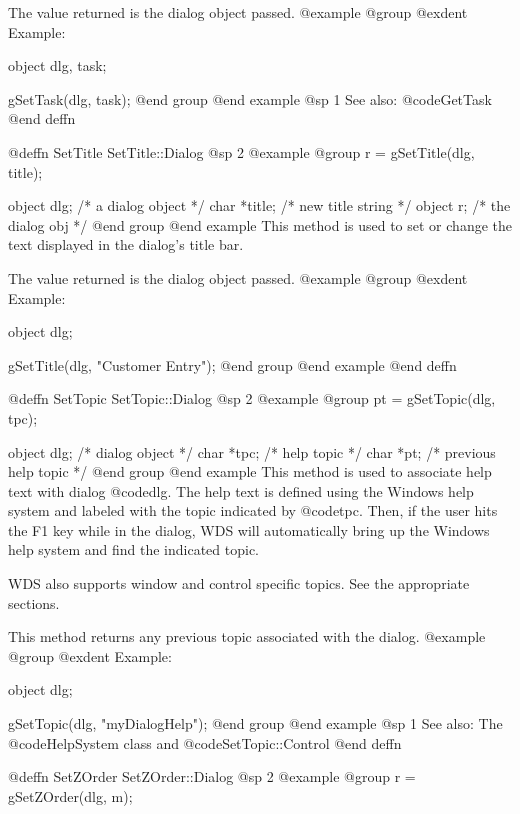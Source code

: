 The value returned is the dialog object passed.
@example
@group
@exdent Example:

object  dlg, task;

gSetTask(dlg, task);
@end group
@end example
@sp 1
See also:  @code{GetTask}
@end deffn




@deffn {SetTitle} SetTitle::Dialog
@sp 2
@example
@group
r = gSetTitle(dlg, title);

object  dlg;     /*  a dialog object    */
char    *title;  /*  new title string   */
object  r;       /*  the dialog obj     */
@end group
@end example
This method is used to set or change the text displayed in the dialog's
title bar.

The value returned is the dialog object passed.
@example
@group
@exdent Example:

object  dlg;

gSetTitle(dlg, "Customer Entry");
@end group
@end example
@end deffn




@deffn {SetTopic} SetTopic::Dialog
@sp 2
@example
@group
pt = gSetTopic(dlg, tpc);

object  dlg;    /*  dialog object         */
char    *tpc;   /*  help topic            */
char    *pt;    /*  previous help topic   */
@end group
@end example
This method is used to associate help text with dialog @code{dlg}.
The help text is defined using the Windows help system and labeled
with the topic indicated by @code{tpc}.  Then, if the user hits
the F1 key while in the dialog, WDS will automatically bring up
the Windows help system and find the indicated topic.

WDS also supports window and control specific topics.  See the appropriate
sections.

This method returns any previous topic associated with the dialog.
@example
@group
@exdent Example:

object  dlg;

gSetTopic(dlg, "myDialogHelp");
@end group
@end example
@sp 1
See also:  The @code{HelpSystem} class and @code{SetTopic::Control} 
@end deffn















@deffn {SetZOrder} SetZOrder::Dialog
@sp 2
@example
@group
r = gSetZOrder(dlg, m);

